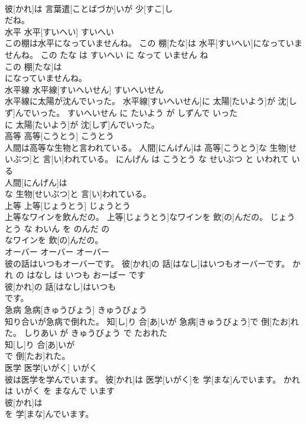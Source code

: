 \documentclass[8pt]{extreport}
\begin{document}
\begin{CJK}{UTF8}{min}
\\	彼[かれ]は 言葉遣[ことばづか]いが 少[すこ]し
\\	だね。			
\\	水平	水平[すいへい]	すいへい	
\\	この棚は水平になっていませんね。	この 棚[たな]は 水平[すいへい]になっていませんね。	この たな は すいへい に なって いません ね	
\\	この 棚[たな]は
\\	になっていませんね。			
\\	水平線	水平線[すいへいせん]	すいへいせん	
\\	水平線に太陽が沈んでいった。	水平線[すいへいせん]に 太陽[たいよう]が 沈[しず]んでいった。	すいへいせん に たいよう が しずんで いった	
\\	に 太陽[たいよう]が 沈[しず]んでいった。			
\\	高等	高等[こうとう]	こうとう	
\\	人間は高等な生物と言われている。	人間[にんげん]は 高等[こうとう]な 生物[せいぶつ]と 言[い]われている。	にんげん は こうとう な せいぶつ と いわれて いる	
\\	人間[にんげん]は
\\	な 生物[せいぶつ]と 言[い]われている。			
\\	上等	上等[じょうとう]	じょうとう	
\\	上等なワインを飲んだの。	上等[じょうとう]なワインを 飲[の]んだの。	じょうとう な わいん を のんだ の	
\\	なワインを 飲[の]んだの。			
\\	オーバー	オーバー	オーバー	
\\	彼の話はいつもオーバーです。	彼[かれ]の 話[はなし]はいつもオーバーです。	かれ の はなし は いつも おーばー です	
\\	彼[かれ]の 話[はなし]はいつも
\\	です。			
\\	急病	急病[きゅうびょう]	きゅうびょう	
\\	知り合いが急病で倒れた。	知[し]り 合[あ]いが 急病[きゅうびょう]で 倒[たお]れた。	しりあい が きゅうびょう で たおれた	
\\	知[し]り 合[あ]いが
\\	で 倒[たお]れた。			
\\	医学	医学[いがく]	いがく	
\\	彼は医学を学んでいます。	彼[かれ]は 医学[いがく]を 学[まな]んでいます。	かれ は いがく を まなんで います	
\\	彼[かれ]は
\\	を 学[まな]んでいます。			

\end{CJK}
\end{document}
